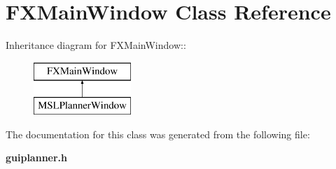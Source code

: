 \section{FXMain\-Window  Class Reference}
\label{classFXMainWindow}
Inheritance diagram for FXMain\-Window::\begin{figure}[H]
\begin{center}
\leavevmode
\includegraphics[height=2cm]{classFXMainWindow}
\end{center}
\end{figure}


The documentation for this class was generated from the following file:\begin{CompactItemize}
\item 
{\bf guiplanner.h}\end{CompactItemize}
